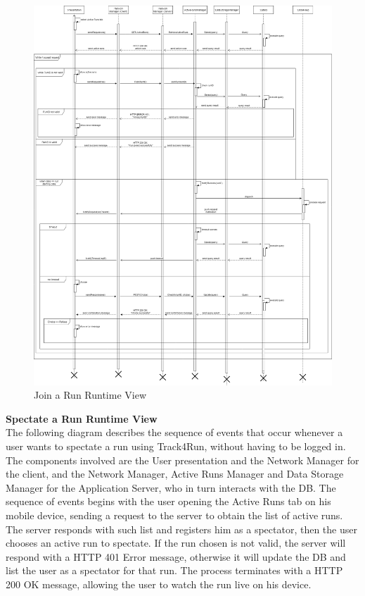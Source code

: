 \documentclass[titlepage]{article}
\begin{document}
\begin{figure}[H]
	\center
  	\includegraphics[width=15cm]{Join.png}
  	\caption{Join a Run Runtime View}
 	\label{fig:JOIN}
\end{figure}


{\bf Spectate a Run Runtime View }\\ 
The following diagram describes the sequence of events that occur whenever a user wants to spectate a run using Track4Run, without having to be logged in.
The components involved are the User presentation and the Network Manager for the client, and the Network Manager, Active Runs Manager and Data Storage Manager for the Application Server, who in turn interacts with the DB.
The sequence of events begins with the user opening the Active Runs tab on his mobile device, sending a request to the server to obtain the list of active runs. The server responds with such list and registers him as a spectator, then the user chooses an active run to spectate. If the run chosen is not valid, the server will respond with a HTTP 401 Error message, otherwise it will update the DB and list the user as a spectator for that run. The process terminates with a HTTP 200 OK message, allowing the user to watch the run live on his device.
\end{document}
